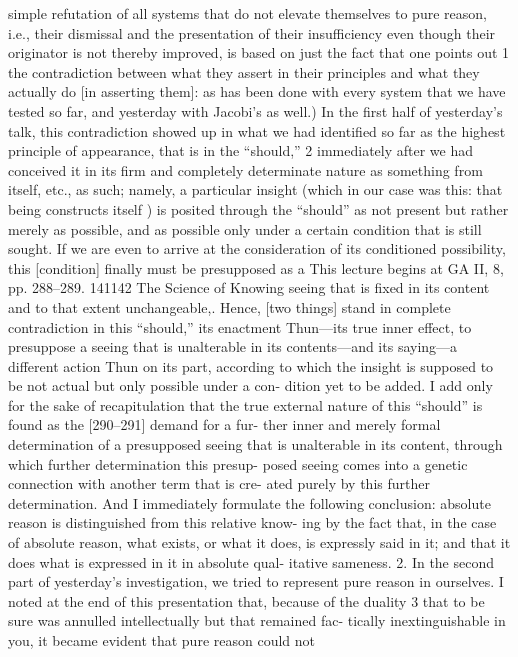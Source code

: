 simple refutation of all systems that do not elevate themselves to pure reason,
i.e., their dismissal and the presentation of their insufficiency even though
their originator is not thereby improved, is based on just the fact that one
points out 1 the contradiction between what they assert in their principles and
what they actually do [in asserting them]: as has been done with every system
that we have tested so far, and yesterday with Jacobi’s as well.) In the first half
of yesterday’s talk, this contradiction showed up in what we had identified so
far as the highest principle of appearance, that is in the “should,” 2 immediately
after we had conceived it in its firm and completely determinate nature as
something from itself, etc., as such; namely, a particular insight (which in our
case was this: that being constructs itself ) is posited through the “should” as
not present but rather merely as possible, and as possible only under a certain
condition that is still sought. If we are even to arrive at the consideration of
its conditioned possibility, this [condition] finally must be presupposed as a
This lecture begins at GA II, 8, pp. 288–289.
141142
The Science of Knowing
seeing that is fixed in its content and to that extent unchangeable,. Hence,
[two things] stand in complete contradiction in this “should,” its enactment
{Thun}—its true inner effect, to presuppose a seeing that is unalterable in its
contents—and its saying—a different action {Thun} on its part, according to
which the insight is supposed to be not actual but only possible under a con-
dition yet to be added. I add only for the sake of recapitulation that the true
external nature of this “should” is found as the [290–291] demand for a fur-
ther inner and merely formal determination of a presupposed seeing that is
unalterable in its content, through which further determination this presup-
posed seeing comes into a genetic connection with another term that is cre-
ated purely by this further determination. And I immediately formulate the
following conclusion: absolute reason is distinguished from this relative know-
ing by the fact that, in the case of absolute reason, what exists, or what it does,
is expressly said in it; and that it does what is expressed in it in absolute qual-
itative sameness.
2. In the second part of yesterday’s investigation, we tried to represent
pure reason in ourselves. I noted at the end of this presentation that, because
of the duality 3 that to be sure was annulled intellectually but that remained fac-
tically inextinguishable in you, it became evident that pure reason could not

